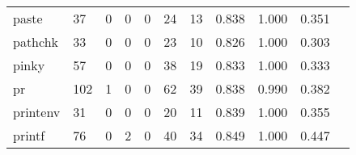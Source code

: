 \begin{longtable}{lp{1.2cm}p{1.2cm}p{1.2cm}p{1.2cm}p{1.2cm}p{1.2cm}p{1.2cm}p{1.2cm}p{1.2cm}p{1.2cm}}
paste     &                                    37 &                                                  0 &                                                  0 &                                                  0 &                                                 24 &                                                 13 &                                         0.838 &                                              1.000 &                                              0.351 \\
pathchk   &                                    33 &                                                  0 &                                                  0 &                                                  0 &                                                 23 &                                                 10 &                                         0.826 &                                              1.000 &                                              0.303 \\
pinky     &                                    57 &                                                  0 &                                                  0 &                                                  0 &                                                 38 &                                                 19 &                                         0.833 &                                              1.000 &                                              0.333 \\
pr        &                                   102 &                                                  1 &                                                  0 &                                                  0 &                                                 62 &                                                 39 &                                         0.838 &                                              0.990 &                                              0.382 \\
printenv  &                                    31 &                                                  0 &                                                  0 &                                                  0 &                                                 20 &                                                 11 &                                         0.839 &                                              1.000 &                                              0.355 \\
printf    &                                    76 &                                                  0 &                                                  2 &                                                  0 &                                                 40 &                                                 34 &                                         0.849 &                                              1.000 &                                              0.447 \\

\end{longtable}
